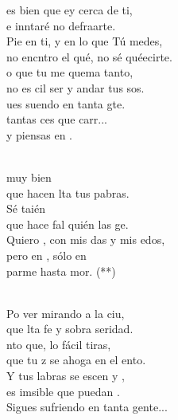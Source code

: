 \begin{cancion}[Piensas en mí][Nico]%
	es bien que ey cerca de ti,\\
	e inntaré no defraarte.\\
	Pie en ti, y en lo que Tú medes,\\
	no encntro el qué, no sé quéecirte.\\
	o que tu  me quema tanto,\\
	no es cil ser y andar tus sos. \\
\jump
	ues suendo en tanta gte. \\
	 tantas ces que carr...\\
	y  piensas en .  \\\jump\\
	\begin{chorus}%
	 muy bien  \\
	que hacen lta tus pabras.\\
	Sé taién \\
	que hace fal quién las ge.\\
	Quiero , con mis das y mis edos,\\
	pero en , sólo en\\
	parme hasta mor. (**)\\
	\end{chorus}%
	\jump\\
	Po ver mirando a la ciu,\\
	que lta fe y sobra seridad.\\
	nto que, lo fácil tiras, \\
	que tu z se ahoga en el ento.\\
	Y tus labras se escen y , \\
	es imsible que puedan .\\
Sigues sufriendo en tanta gente...\\
\end{cancion}%
